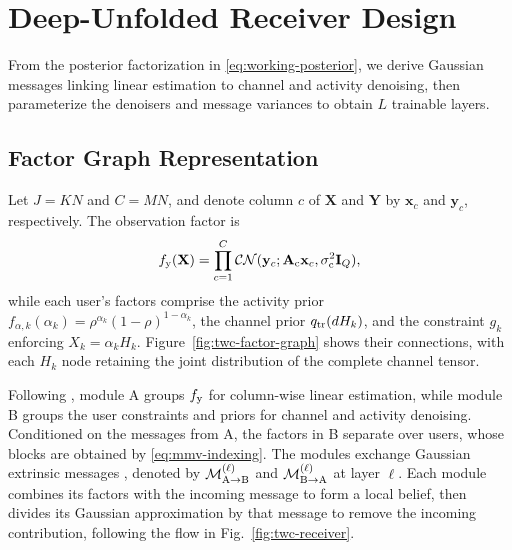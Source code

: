\section{Deep-Unfolded Receiver Design}
\label{sec:algorithm}

From the posterior factorization in \eqref{eq:working-posterior}, we
derive Gaussian messages linking linear estimation to channel and
activity denoising, then parameterize the denoisers and message
variances to obtain $L$ trainable layers.

\subsection{Factor Graph Representation}

Let $J=KN$ and $C=MN$, and denote column $c$ of $\mathbf X$ and
$\mathbf Y$ by $\mathbf x_c$ and $\mathbf y_c$, respectively.
The observation factor is
\begin{equation}
 f_{\rm y}(\mathbf X)
 =\prod_{c=1}^{C}\mathcal{CN}(\mathbf y_c;
       \mathbf A_{\rm c}\mathbf x_c,\sigma_{\rm c}^2\mathbf{I}_Q),
 \label{eq:twc-factor-definitions}
\end{equation}
while each user's factors comprise the activity prior
$f_{\alpha,k}(\alpha_k)=\rho^{\alpha_k}(1-\rho)^{1-\alpha_k}$,
the channel prior $q_{\rm tr}(dH_k)$, and the constraint $g_k$
enforcing $X_k=\alpha_kH_k$. Figure~\ref{fig:twc-factor-graph}
shows their connections, with each $H_k$ node retaining the joint
distribution of the complete channel tensor.



Following \cite{cai2026}, module A groups $f_{\rm y}$ for column-wise
linear estimation, while module B groups the user constraints and
priors for channel and activity denoising. Conditioned on the messages
from A, the factors in B separate over users, whose blocks are obtained
by \eqref{eq:mmv-indexing}. The modules exchange Gaussian extrinsic
messages \cite{minka2001,cai2026}, denoted by
$\mathcal M_{\rm A\to B}^{(\ell)}$ and
$\mathcal M_{\rm B\to A}^{(\ell)}$ at layer $\ell$. Each module
combines its factors with the incoming message to form a local belief,
then divides its Gaussian approximation by that message to remove
the incoming contribution, following the flow in
Fig.~\ref{fig:twc-receiver}.

